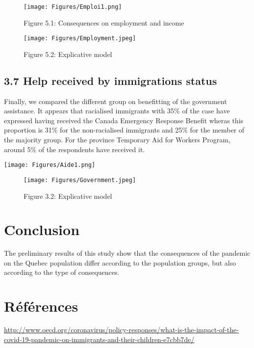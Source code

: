 \documentclass[
]{article}
\begin{document}
\begin{figure}
\centering
\texttt{[image: Figures/Emploi1.png]}
\caption{Figure 5.1: Consequences on employment and income}
\end{figure}

\begin{figure}
\centering
\texttt{[image: Figures/Employment.jpeg]}
\caption{Figure 5.2: Explicative model}
\end{figure}

\hypertarget{help-received-by-immigrations-status}{%
\subsection{3.7 Help received by immigrations status}\label{help-received-by-immigrations-status}}

Finally, we compared the different group on benefitting of the government
assistance. It appears that racialised immigrants with 35\% of the case have
expressed having received the Canada Emergency Response Benefit wheras this
proportion is 31\% for the non-racialised immigrants and 25\% for the member of
the majority group. For the province Temporary Aid for Workers Program, around
5\% of the respondents have received it.

\texttt{[image: Figures/Aide1.png]}

\begin{figure}
\centering
\texttt{[image: Figures/Government.jpeg]}
\caption{Figure 3.2: Explicative model}
\end{figure}

\newpage

\hypertarget{conclusion}{%
\section{Conclusion}\label{conclusion}}

The preliminary results of this study show that the consequences of the pandemic
on the Quebec population differ according to the population groups, but also
according to the type of consequences.

\newpage

\hypertarget{ruxe9fuxe9rences}{%
\section{Références}\label{ruxe9fuxe9rences}}

\url{http://www.oecd.org/coronavirus/policy-responses/what-is-the-impact-of-the-covid-19-pandemic-on-immigrants-and-their-children-e7cbb7de/}
\end{document}
